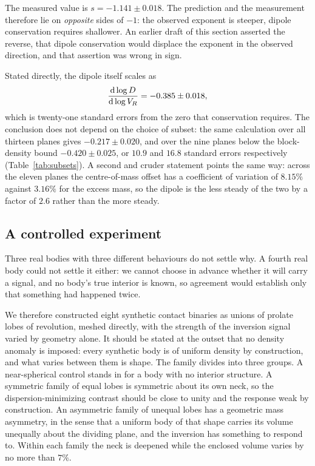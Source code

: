 The measured value is $s = -1.141 \pm 0.018$. The prediction and the
measurement therefore lie on \emph{opposite} sides of $-1$: the observed
exponent is steeper, dipole conservation requires shallower. An earlier
draft of this section asserted the reverse, that dipole conservation would
displace the exponent in the observed direction, and that assertion was
wrong in sign.

Stated directly, the dipole itself scales as
%
\begin{equation}
\frac{\mathrm{d}\log D}{\mathrm{d}\log V_{R}}
 = -0.385 \pm 0.018 ,
\label{eq:dipoleslope}
\end{equation}
%
which is twenty-one standard errors from the zero that conservation
requires. The conclusion does not depend on the choice of subset: the same
calculation over all thirteen planes gives $-0.217 \pm 0.020$, and over the
nine planes below the block-density bound $-0.420 \pm 0.025$, or $10.9$ and
$16.8$ standard errors respectively (Table~\ref{tab:subsets}). A second and
cruder statement points the same way: across the eleven planes the
centre-of-mass offset has a coefficient of variation of $8.15\%$ against
$3.16\%$ for the excess mass, so the dipole is the less steady of the two
by a factor of $2.6$ rather than the more steady.


\subsection{A controlled experiment}
\label{sec:constrains:synthetic}

Three real bodies with three different behaviours do not settle why. A
fourth real body could not settle it either: we cannot choose in advance
whether it will carry a signal, and no body's true interior is known, so
agreement would establish only that something had happened twice.

We therefore constructed eight synthetic contact binaries as unions of
prolate lobes of revolution, meshed directly, with the strength of the
inversion signal varied by geometry alone. It should be stated at the outset
that no density anomaly is imposed: every synthetic body is of uniform
density by construction, and what varies between them is shape. The family
divides into three groups. A near-spherical control stands in for a body
with no interior structure. A symmetric family of equal lobes is symmetric
about its own neck, so the dispersion-minimizing contrast should be close to
unity and the response weak by construction. An asymmetric family of unequal
lobes has a geometric mass asymmetry, in the sense that a uniform body of
that shape carries its volume unequally about the dividing plane, and the
inversion has something to respond to. Within each family the neck is
deepened while the enclosed volume varies by no more than $7\%$.

